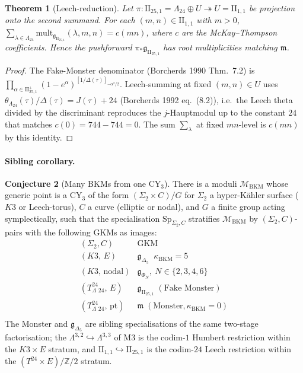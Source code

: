 \documentclass[11pt]{article}
\providecommand{\Z}{\mathbb{Z}}
\providecommand{\Lat}{\Lambda}
\providecommand{\Leech}{\Lambda_{24}}
\providecommand{\IIlor}{\mathrm{II}_{25,1}}
\providecommand{\IIonel}{\mathrm{II}_{1,1}}
\providecommand{\gBKM}{\mathfrak{g}}
\providecommand{\mMon}{\mathfrak{m}}
\providecommand{\kBKM}{\kappa_{\mathrm{BKM}}}
\providecommand{\Sp}{\mathrm{Sp}}
\theoremstyle{plain}
\newtheorem{theorem}{Theorem}
\theoremstyle{definition}
\newtheorem{conjecture}[theorem]{Conjecture}
\begin{document}
\begin{theorem}[Leech-reduction]\label{thm:leech-reduction}
Let $\pi:\IIlor=\Leech\oplus U\twoheadrightarrow U=\IIonel$ be
projection onto the second summand. For each $(m,n)\in\IIonel$ with
$m>0$, $\sum_{\lambda\in\Leech}\mathrm{mult}_{\gBKM_{\IIlor}}(\lambda,m,n)
= c(mn)$, where $c$ are the McKay--Thompson coefficients. Hence
the pushforward $\pi_*\gBKM_{\IIlor}$ has root multiplicities matching
$\mMon$.
\end{theorem}
\begin{proof}
The Fake-Monster denominator (Borcherds 1990 Thm.~7.2) is
$\prod_{\alpha\in\IIlor^+}(1-e^\alpha)^{[1/\Delta(\tau)]_{-\alpha^2/2}}$.
Leech-summing at fixed $(m,n)\in U$ uses
$\theta_\Leech(\tau)/\Delta(\tau)=J(\tau)+24$ (Borcherds 1992
eq.~(8.2)), i.e.\ the Leech theta divided by the discriminant
reproduces the $j$-Hauptmodul up to the constant $24$ that matches
$c(0)=744-744=0$. The sum $\sum_\lambda$ at fixed $mn$-level is
$c(mn)$ by this identity.
\end{proof}

\paragraph{Sibling corollary.}
\begin{conjecture}[Many BKMs from one CY$_3$]
\label{conj:many-bkm-one-cy3}
There is a moduli $\mathcal{M}_{\mathrm{BKM}}$ whose generic point is
a CY$_3$ of the form $(\Sigma_2\times C)/G$ for $\Sigma_2$ a hyper-K\"ahler
surface ($K3$ or Leech-torus), $C$ a curve (elliptic or nodal), and
$G$ a finite group acting symplectically, such that the specialisation
$\Sp_{\Sigma_2,C}$ stratifies $\mathcal{M}_{\mathrm{BKM}}$ by
$(\Sigma_2,C)$-pairs with the following GKMs as images:
\[
  \begin{array}{l|l}
   (\Sigma_2,C) & \text{GKM} \\\hline
   (K3,\,E) & \gBKM_{\Delta_5}\;\;\kBKM=5\\
   (K3,\,\mathrm{nodal}) & \gBKM_{\Phi_N},\ N\in\{2,3,4,6\}\\
   (T^{24}_\Leech,\,E) & \gBKM_{\IIlor}\;(\text{Fake Monster})\\
   (T^{24}_\Leech,\,\mathrm{pt}) & \mMon\;(\text{Monster},\kBKM=0)\\
  \end{array}
\]
The Monster and $\gBKM_{\Delta_5}$ are sibling specialisations of
the same two-stage factorisation; the $\Lat^{3,2}\hookrightarrow
\Lat^{3,3}$ of M3 is the codim-$1$ Humbert restriction within the
$K3\times E$ stratum, and $\IIonel\hookrightarrow\IIlor$ is the
codim-$24$ Leech restriction within the $(T^{24}\times E)/\Z/2$
stratum.
\end{conjecture}
\end{document}
